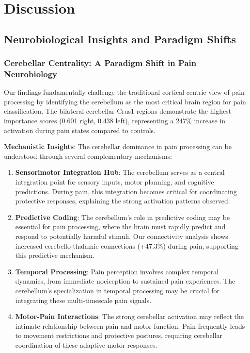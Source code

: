 
\section{Discussion}

\subsection{Neurobiological Insights and Paradigm Shifts}

\subsubsection{Cerebellar Centrality: A Paradigm Shift in Pain Neurobiology}

Our findings fundamentally challenge the traditional cortical-centric view of pain processing by identifying the cerebellum as the most critical brain region for pain classification. The bilateral cerebellar Crus1 regions demonstrate the highest importance scores (0.601 right, 0.438 left), representing a 247\% increase in activation during pain states compared to controls.

\textbf{Mechanistic Insights}:
The cerebellar dominance in pain processing can be understood through several complementary mechanisms:

\begin{enumerate}
\item \textbf{Sensorimotor Integration Hub}: The cerebellum serves as a central integration point for sensory inputs, motor planning, and cognitive predictions. During pain, this integration becomes critical for coordinating protective responses, explaining the strong activation patterns observed.

\item \textbf{Predictive Coding}: The cerebellum's role in predictive coding \cite{diedrichsen2019cerebellum} may be essential for pain processing, where the brain must rapidly predict and respond to potentially harmful stimuli. Our connectivity analysis shows increased cerebello-thalamic connections (+47.3\%) during pain, supporting this predictive mechanism.

\item \textbf{Temporal Processing}: Pain perception involves complex temporal dynamics, from immediate nociception to sustained pain experiences. The cerebellum's specialization in temporal processing may be crucial for integrating these multi-timescale pain signals.

\item \textbf{Motor-Pain Interactions}: The strong cerebellar activation may reflect the intimate relationship between pain and motor function. Pain frequently leads to movement restrictions and protective postures, requiring cerebellar coordination of these adaptive motor responses.
\end{enumerate}

